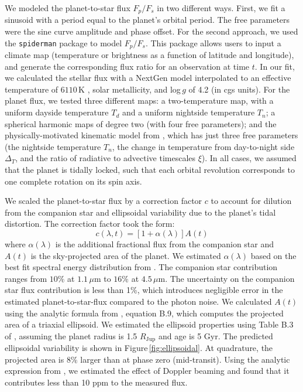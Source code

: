 \documentclass[twocolumn]{aastex61}
\begin{document}
We modeled the planet-to-star flux $F_p/F_s$ in two different ways. First, we fit a sinusoid with a period equal to the planet's orbital period. The free parameters were the sine curve amplitude and phase offset. For the second approach, we used the \texttt{spiderman} package \citep{louden17} to model $F_p/F_s$. This package allows users to input a climate map (temperature or brightness as a function of latitude and longitude), and generate the corresponding flux ratio for an observation at time $t$.  In our fit, we calculated the stellar flux with a NextGen model \citep{allard12} interpolated to an effective temperature of $6110\,\mathrm{K}$ \citep{gillon14}, solar metallicity, and log\,$g$ of 4.2 (in cgs units).  For the planet flux, we tested three different maps: a two-temperature map, with a uniform dayside temperature $T_d$ and a uniform nightside temperature $T_n$; a spherical harmonic maps of degree two (with four free parameters); and the physically-motivated kinematic model from \cite{zhang17}, which has just three free parameters (the nightside temperature $T_n$, the change in temperature from day-to-night side $\Delta_T$, and the ratio of radiative to advective timescales $\xi$).  In all cases, we assumed that the planet is tidally locked, such that each orbital revolution corresponds to one complete rotation on its spin axis. 

We scaled the planet-to-star flux by a correction factor $c$ to account for dilution from the companion star and ellipsoidal variability due to the planet's tidal distortion. The correction factor took the form: 
\begin{equation}
	c(\lambda, t) = [1 + \alpha(\lambda)]A(t)
\end{equation}
where $\alpha(\lambda)$ is the additional fractional flux from the companion star and $A(t)$ is the sky-projected area of the planet. We estimated $\alpha(\lambda)$ based on the best fit spectral energy distribution from \cite{cartier17}. The companion star contribution ranges from $10\%$ at $1.1\,\mu$m to $16\%$ at $4.5\,\mu$m. The uncertainty on the companion star flux contribution is less than 1\%, which introduces negligible error in the estimated planet-to-star-flux compared to the photon noise.   We calculated $A(t)$ using the analytic formula from \cite{leconte11b}, equation B.9, which computes the projected area of a triaxial ellipsoid. We estimated the ellipsoid properties using Table B.3 of \cite{leconte11a}, assuming the planet radius is 1.5 $R_\mathrm{Jup}$ and age is 5 Gyr. The predicted ellipsoidal variability is shown in Figure\,\ref{fig:ellipsoidal}. At quadrature, the projected area is $8\%$ larger than at phase zero (mid-transit). Using the analytic expression from \cite{loeb03}, we estimated the effect of Doppler beaming and found that it contributes less than 10 ppm to the measured flux. 
\end{document}

